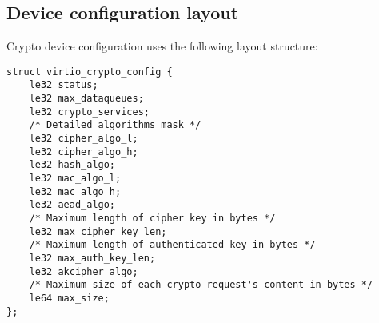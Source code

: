 \subsection{Device configuration layout}\label{sec:Device Types / Crypto Device / Device configuration layout}

Crypto device configuration uses the following layout structure:

\begin{lstlisting}
struct virtio_crypto_config {
    le32 status;
    le32 max_dataqueues;
    le32 crypto_services;
    /* Detailed algorithms mask */
    le32 cipher_algo_l;
    le32 cipher_algo_h;
    le32 hash_algo;
    le32 mac_algo_l;
    le32 mac_algo_h;
    le32 aead_algo;
    /* Maximum length of cipher key in bytes */
    le32 max_cipher_key_len;
    /* Maximum length of authenticated key in bytes */
    le32 max_auth_key_len;
    le32 akcipher_algo;
    /* Maximum size of each crypto request's content in bytes */
    le64 max_size;
};
\end{lstlisting}

